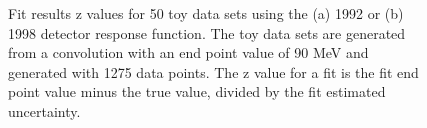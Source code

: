 \begin{figure}[h]
  \centering
  \hfill
  \caption{Fit results z values for 50 toy data sets using the (a) 1992 or (b) 1998 detector response function.
    The toy data sets are generated from a convolution with an end point value of 90 MeV and generated
    with 1275 data points. The z value for a fit is the fit end point value minus the true value, divided
    by the fit estimated uncertainty. 
  }
  \label{fig:ToyFitZs}
\end{figure}








